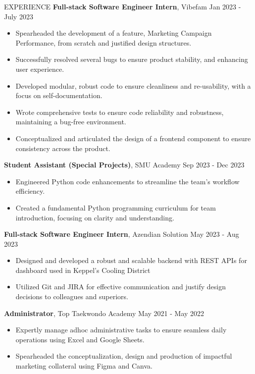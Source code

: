 \documentclass{resume} %
\begin{document}
\begin{rSection}{EXPERIENCE}
\textbf{Full-stack Software Engineer Intern}, Vibefam \hfill Jan 2023 - July 2023\\
 \vspace{-1.25em}
 \begin{itemize}
    \itemsep -5pt {} 
     \item {Spearheaded the development of a feature, Marketing Campaign Performance, from scratch and justified design structures.}
     \item {Successfully resolved several bugs to ensure product stability, and enhancing user experience.}
     \item {Developed modular, robust code to ensure cleanliness and re-usability, with a focus on self-documentation.}
     \item {Wrote comprehensive tests to ensure code reliability and robustness, maintaining a bug-free environment.}
     \item {Conceptualized and articulated the design of a frontend component to ensure consistency across the product.}
 \end{itemize}

\textbf{Student Assistant (Special Projects)}, SMU Academy \hfill Sep 2023 - Dec 2023\\
 \vspace{-1.25em}
 \begin{itemize}
    \itemsep -5pt {} 
     \item {Engineered Python code enhancements to streamline the team's workflow efficiency.}
     \item {Created a fundamental Python programming curriculum for team introduction, focusing on clarity and understanding.}
 \end{itemize}

\textbf{Full-stack Software Engineer Intern}, Azendian Solution \hfill May 2023 - Aug 2023\\
 \vspace{-1.25em}
 \begin{itemize}
    \itemsep -5pt {} 
     \item {Designed and developed a robust and scalable backend with REST APIs for dashboard used in Keppel's Cooling District}
     \item {Utilized Git and JIRA for effective communication and justify design decisions to colleagues and superiors.}
 \end{itemize}

\textbf{Administrator}, Top Taekwondo Academy \hfill May 2021 - May 2022\\
 \vspace{-1.25em}
 \begin{itemize}
    \itemsep -5pt {} 
     \item {Expertly manage adhoc administrative tasks to ensure seamless daily operations using Excel and Google Sheets.}
     \item {Spearheaded the conceptualization, design and production of impactful marketing collateral using Figma and Canva.}
 \end{itemize}

\end{rSection} 
\end{document}
